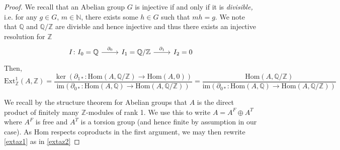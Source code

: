 \documentclass[english]{article}
\newcommand{\NN}{\mathbb{N}}
\newcommand{\ZZ}{\mathbb{Z}}
\newcommand{\QQ}{\mathbb{Q}}
\theoremstyle{remark}
\theoremstyle{definition}
\renewcommand{\hom}{\mathrm{Hom}}
\newcommand{\im}{\mathrm{im}}
\newcommand{\ext}{\mathrm{Ext}}
\newcommand{\del}{\partial}
\begin{document}
\begin{proof}
We recall that an Abelian group $G$ is injective if and only if it is \textit{divisible,} i.e. for any $g\in G$, $m\in \NN$, there exists some $h\in G$ such that $mh=g$. We note that $\QQ$ and $\QQ/\ZZ$ are divisble and hence injective and thus there exists an injective resolution for $\ZZ$ \begin{equation*}
\begin{tikzcd}
	I\colon I_0=\QQ\arrow[r,"\del_0"]& I_1=\QQ/\ZZ\arrow[r,"\del_1"]&I_2=0\end{tikzcd}
\end{equation*}
Then, \begin{equation}\ext^1_\ZZ(A,\ZZ)=\frac{\ker\left(\del_{1*}:\hom(A,\QQ/\ZZ)\to\hom(A,0)\right)}{\im\left(\del_{0*}:\hom(A,\QQ)\to\hom(A,\QQ/\ZZ)\right)}=\frac{\hom(A,\QQ/\ZZ)}{\im\left(\del_{0*}:\hom(A,\QQ)\to\hom(A,\QQ/\ZZ)\right)}\label{extaz1}\end{equation}

We recall by the structure theorem for Abelian groups that $A$ is the direct product of finitely many $\ZZ$-modules of rank 1. We use this to write $A=A^F\oplus A^T$ where $A^F$ is free and $A^T$ is a torsion group (and hence finite by assumption in our case). As $\hom$ respects coproducts in the first argument, we may then rewrite \eqref{extaz1} as in \eqref{extaz2}


\end{proof}
\end{document}
